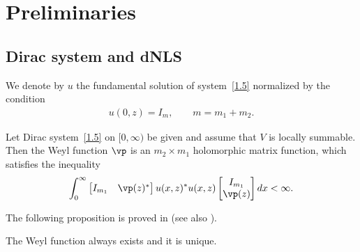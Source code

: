 \section{Preliminaries} \label{Prel}

\subsection{Dirac system and dNLS}

We denote by $u$ the fundamental solution of system~\eqref{1.5} normalized by
the condition
\begin{gather*}  %
u(0,z)=I_m, \qquad m=m_1+m_2.
\end{gather*}
\begin{Definition} \label{CyW2} Let Dirac system~\eqref{1.5} on $[0, \infty)$
 be given and assume that $V$ is locally summable.
Then the Weyl function $\vp$ is an $m_2 \times m_1$ holomorphic matrix function, which satisf\/ies the inequality
\begin{gather}  \label{2.0}
\int_0^{\infty}
\begin{bmatrix}
I_{m_1} & \vp(z)^*
\end{bmatrix}
u(x,z)^*u(x,z)
\begin{bmatrix}
I_{m_1} \\ \vp(z)
\end{bmatrix}dx< \infty .
\end{gather}
\end{Definition}

The following proposition is proved in \cite{FKRSp1} (see also \cite[Section~2.2]{SaSaR}).
\begin{Proposition} The Weyl function always exists and it is unique.
\end{Proposition}

